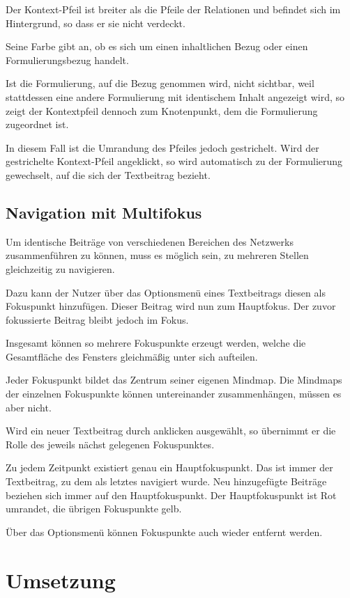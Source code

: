 \documentclass{article}
\begin{document}
	\bigskip
	Der Kontext-Pfeil ist breiter als die Pfeile der Relationen und befindet sich im Hintergrund, so dass er sie nicht verdeckt. 
		
	\bigskip
	Seine Farbe gibt an, ob es sich um einen inhaltlichen Bezug oder einen Formulierungsbezug handelt.
	
	\bigskip
	Ist die Formulierung, auf die Bezug genommen wird, nicht sichtbar, weil stattdessen eine andere Formulierung mit identischem Inhalt angezeigt wird, so zeigt der Kontextpfeil dennoch zum Knotenpunkt, dem die Formulierung zugeordnet ist.
	
	\bigskip
	In diesem Fall ist die Umrandung des Pfeiles jedoch gestrichelt. Wird der gestrichelte Kontext-Pfeil angeklickt, so wird automatisch zu der Formulierung gewechselt, auf die sich der Textbeitrag bezieht.
	
	\subsection{Navigation mit Multifokus}
	
	Um identische Beiträge von verschiedenen Bereichen des Netzwerks zusammenführen zu können, muss es möglich sein, zu mehreren Stellen gleichzeitig zu navigieren.
	
	\bigskip
	Dazu kann der Nutzer über das Optionsmenü eines Textbeitrags diesen als Fokuspunkt hinzufügen. Dieser Beitrag wird nun zum Hauptfokus. Der zuvor fokussierte Beitrag bleibt jedoch im Fokus.
	
	\bigskip
	Insgesamt können so mehrere Fokuspunkte erzeugt werden, welche die Gesamtfläche des Fensters gleichmäßig unter sich aufteilen.
	
	\bigskip
	Jeder Fokuspunkt bildet das Zentrum seiner eigenen Mindmap. Die Mindmaps der einzelnen Fokuspunkte können untereinander zusammenhängen, müssen es aber nicht.
	
	\bigskip
	Wird ein neuer Textbeitrag durch anklicken ausgewählt, so übernimmt er die Rolle des jeweils nächst gelegenen Fokuspunktes.
	
	\bigskip
	Zu jedem Zeitpunkt existiert genau ein Hauptfokuspunkt. Das ist immer der Textbeitrag, zu dem als letztes navigiert wurde. Neu hinzugefügte Beiträge beziehen sich immer auf den Hauptfokuspunkt. Der Hauptfokuspunkt ist Rot umrandet, die übrigen Fokuspunkte gelb.
	
	\bigskip
	Über das Optionsmenü können Fokuspunkte auch wieder entfernt werden.
	
	
	\section{Umsetzung}
	
\end{document}

